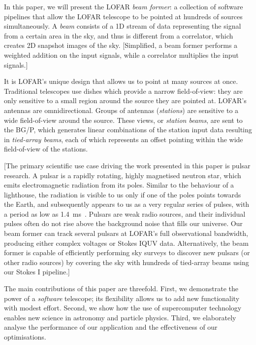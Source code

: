 \documentclass{llncs}
\begin{document}
In this paper, we will present the LOFAR \emph{beam former}: a collection of software pipelines that allow the LOFAR telescope to be pointed at hundreds of sources simultaneously. A \emph{beam} consists of a 1D stream of data representing the signal from a certain area in the sky, and thus is different from a correlator, which creates 2D snapshot images of the sky. [Simplified, a beam former performs a weighted addition on the input signals, while a correlator multiplies the input signals.]

It is LOFAR's unique design that allows us to point at many sources at once. Traditional telescopes use dishes which provide a narrow field-of-view: they are only sensitive to a small region around the source they are pointed at. LOFAR's antennas are omnidirectional. Groups of antennas (\emph{stations}) are sensitive to a wide field-of-view around the source. These views, or \emph{station beams}, are sent to the BG/P, which generates linear combinations of the station input data resulting in \emph{tied-array beams}, each of which represents an offset pointing within the wide field-of-view of the stations.

[The primary scientific use case driving the work presented in this paper is pulsar research. A pulsar is a rapidly rotating, highly magnetised neutron star, which emits electromagnetic radiation from its poles. Similar to the behaviour of a lighthouse, the radiation is visible to us only if one of the poles points towards the Earth, and subsequently appears to us as a very regular series of pulses, with a period as low as 1.4~ms~\cite{Hessels:06}. Pulsars are weak radio sources, and their individual pulses often do not rise above the background noise that fills our universe. Our beam former can track several pulsars at LOFAR's full observational bandwidth, producing either complex voltages or Stokes IQUV data. Alternatively, the beam former is capable of efficiently performing sky surveys to discover new pulsars (or other radio sources) by covering the sky with hundreds of tied-array beams using our Stokes I pipeline.]

The main contributions of this paper are threefold. First, we demonstrate the power of a \emph{software\/} telescope; its flexibility allows us to add new functionality with modest effort. Second, we show how the use of supercomputer technology enables new science in astronomy and particle physics. Third, we elaborately analyse the performance of our application and the effectiveness of our optimisations. 
\end{document}
